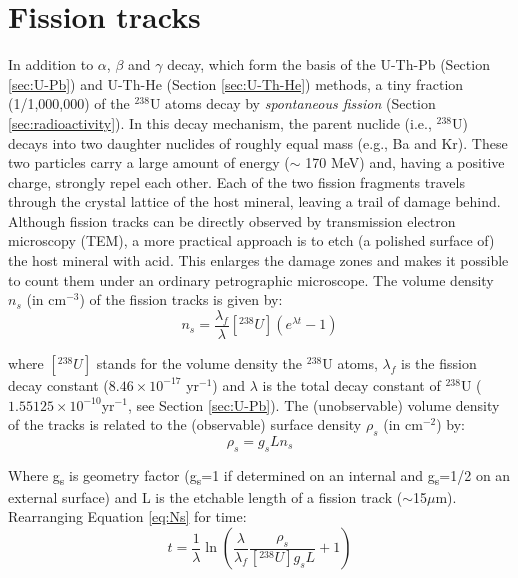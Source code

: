 \section{Fission tracks}
\label{sec:fission-tracks}

In addition to $\alpha$, $\beta$ and $\gamma$ decay, which form the
basis of the U-Th-Pb (Section \ref{sec:U-Pb}) and U-Th-He (Section
\ref{sec:U-Th-He}) methods, a tiny fraction (1/1,000,000) of the
$^{238}$U atoms decay by \emph{spontaneous fission} (Section
\ref{sec:radioactivity}). In this decay mechanism, the parent nuclide
(i.e., $^{238}$U) decays into two daughter nuclides of roughly equal
mass (e.g., Ba and Kr). These two particles carry a large amount of
energy ($\sim$ 170 MeV) and, having a positive charge, strongly repel
each other. Each of the two fission fragments travels through the
crystal lattice of the host mineral, leaving a trail of damage
behind. Although fission tracks can be directly observed by
transmission electron microscopy (TEM), a more practical approach is
to etch (a polished surface of) the host mineral with acid. This
enlarges the damage zones and makes it possible to count them under an
ordinary petrographic microscope. The volume density $n_s$ (in
cm$^{-3}$) of the fission tracks is given by:
\begin{equation}
n_{s} = \frac{\lambda_f}{\lambda} [^{238}U] \left(e^{\lambda t}-1\right)
\label{eq:Ns}
\end{equation}

where $[^{238}U]$ stands for the volume density the $^{238}$U atoms,
$\lambda_f$ is the fission decay constant
($8.46\times{10}^{-17}$ yr$^{-1}$) and $\lambda$ is the total decay
constant of $^{238}$U ($1.55125\times{10}^{-10}$yr$^{-1}$, see Section
\ref{sec:U-Pb}). The (unobservable) volume density of the tracks is
related to the (observable) surface density $\rho_s$ (in cm$^{-2}$)
by:
\begin{equation}
\rho_s = g_s L n_s
\label{eq:rhos}
\end{equation}

Where g\textsubscript{s} is geometry factor (g\textsubscript{s}=1 if
determined on an internal and g\textsubscript{s}=1/2 on an external
surface) and L is the etchable length of a fission track
($\sim$15$\mu$m). Rearranging Equation \ref{eq:Ns} for time:
\begin{equation}
t = \frac{1}{\lambda}
\ln\left(\frac{\lambda}{\lambda_f}\frac{\rho_s}{[^{238}U] g_s L
}+1\right)
\label{eq:tFT}
\end{equation}

